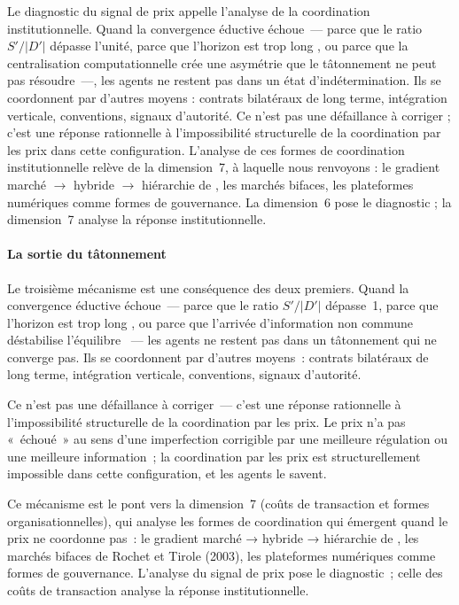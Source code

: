 Le diagnostic du signal de prix appelle l'analyse de la coordination institutionnelle. Quand la convergence éductive échoue~--- parce que le ratio $S'/|D'|$ dépasse l'unité, parce que l'horizon est trop long \parencite{evans_guesnerie_mcgough_2019}, ou parce que la centralisation computationnelle crée une asymétrie que le tâtonnement ne peut pas résoudre~---, les agents ne restent pas dans un état d'indétermination. Ils se coordonnent par d'autres moyens : contrats bilatéraux de long terme, intégration verticale, conventions, signaux d'autorité. Ce n'est pas une défaillance à corriger ; c'est une réponse rationnelle à l'impossibilité structurelle de la coordination par les prix dans cette configuration. L'analyse de ces formes de coordination institutionnelle relève de la dimension~7, à laquelle nous renvoyons : le gradient marché $\to$ hybride $\to$ hiérarchie de \textcite{williamson_economic_1985}, les marchés bifaces, les plateformes numériques comme formes de gouvernance. La dimension~6 pose le diagnostic ; la dimension~7 analyse la réponse institutionnelle.

\iffalse
\paragraph{La sortie du tâtonnement}

Le troisième mécanisme est une conséquence des deux premiers. Quand la convergence éductive échoue~--- parce que le ratio $S'/|D'|$ dépasse~1, parce que l'horizon est trop long \parencite{evans_guesnerie_mcgough_2019}, ou parce que l'arrivée d'information non commune déstabilise l'équilibre \parencite{guesnerie_understanding_2021}~--- les agents ne restent pas dans un tâtonnement qui ne converge pas. Ils se coordonnent par d'autres moyens~: contrats bilatéraux de long terme, intégration verticale, conventions, signaux d'autorité.

Ce n'est pas une défaillance à corriger~--- c'est une réponse rationnelle à l'impossibilité structurelle de la coordination par les prix. Le prix n'a pas «~échoué~» au sens d'une imperfection corrigible par une meilleure régulation ou une meilleure information~; la coordination par les prix est structurellement impossible dans cette configuration, et les agents le savent.

Ce mécanisme est le pont vers la dimension~7 (coûts de transaction et formes organisationnelles), qui analyse les formes de coordination qui émergent quand le prix ne coordonne pas~: le gradient marché → hybride → hiérarchie de \textcite{williamson_economic_1985}, les marchés bifaces de Rochet et Tirole (2003), les plateformes numériques comme formes de gouvernance. L'analyse du signal de prix pose le diagnostic~; celle des coûts de transaction analyse la réponse institutionnelle.

